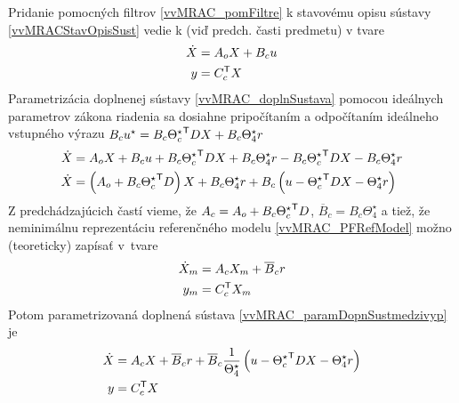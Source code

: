 \documentclass[a4paper, 10pt, ]{article}
\begin{document}
Pridanie pomocných filtrov \eqref{vvMRAC_pomFiltre} k stavovému opisu sústavy \eqref{vvMRACStavOpisSust} vedie k  (viď predch. časti predmetu) v tvare
\begin{subequations} \label{vvMRAC_doplnSustava}
	\begin{align}
		\dot X &=  A_o  X + B_c u \\
		y &= C_c^{\mathsf{T}}  X
	\end{align}
\end{subequations}
Parametrizácia doplnenej sústavy \eqref{vvMRAC_doplnSustava} pomocou ideálnych parametrov zákona riadenia sa dosiahne pripočítaním a odpočítaním ideálneho vstupného výrazu $B_c u^\star = B_c {\Theta_c^\star}^{\mathsf{T}} D  X + B_c \Theta_4^\star r $
\begin{subequations} \label{vvMRAC_doplnSustava_02}
	\begin{align}
		\dot X &= A_o X + B_c u +  B_c {\Theta_c^\star}^{\mathsf{T}} D   X  + B_c  \Theta_4^\star  r - B_c {\Theta_c^\star}^{\mathsf{T}} D   X  -  B_c  \Theta_4^\star  r	\\
		\dot X &= \left( A_o + B_c {\Theta_c^\star}^{\mathsf{T}} D \right)  X + B_c  \Theta_4^\star r + B_c \left( u - {\Theta_c^\star}^{\mathsf{T}} D  X - \Theta_4^\star  r \right)	  \label{vvMRAC_paramDopnSustmedzivyp}
	\end{align}
\end{subequations}
Z predchádzajúcich častí vieme, že $ A_c = A_o + B_c {\Theta_c^\star}^{\mathsf{T}} D $, $\overline{B}_c = B_c \Theta_4^\star$ a tiež, že neminimálnu reprezentáciu referenčného modelu \eqref{vvMRAC_PFRefModel} možno (teoreticky) zapísať v~tvare
\begin{subequations} \label{vvMRAC_NeminRefModel}
	\begin{align}
		\dot X_m &= A_c X_m + \overline{B}_c r \\
		y_m &= C_c^{\mathsf{T}} X_m
	\end{align}
\end{subequations}
Potom parametrizovaná doplnená sústava \eqref{vvMRAC_paramDopnSustmedzivyp} je
\begin{subequations}
\label{vvMRAC_ParametrizovanaDoplnSustava}
	\begin{align}
		\dot X &= A_c X + \overline{B}_c r + \overline{B}_c \frac{1}{\Theta_4^\star} \left( u - {\Theta_c^\star}^{\mathsf{T}} D  X - \Theta_4^\star r \right) \\
		y &= C_c^{\mathsf{T}}  X
	\end{align}
\end{subequations}
\end{document}
